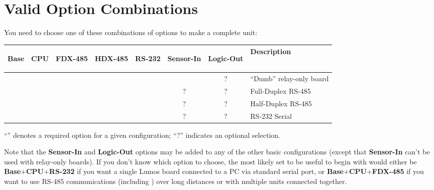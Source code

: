 \documentclass[letterpaper,twoside,onecolumn,openright,final]{memoir}
\begin{document}
\section{Valid Option Combinations}
You need to choose one of these combinations of options to make a complete unit:
\begin{center}
    \begin{tabular}{|c|c|c|c|c|c|c|l|}\hline
	
\begin{sideways}\bfseries Base \end{sideways}
& \begin{sideways}\bfseries CPU \end{sideways}
& \begin{sideways}\bfseries FDX-485\end{sideways}
& \begin{sideways}\bfseries HDX-485\end{sideways}
& \begin{sideways}\bfseries RS-232 \end{sideways}
& \begin{sideways}\bfseries Sensor-In \end{sideways}
& \begin{sideways}\bfseries Logic-Out\quad\strut \end{sideways}
& \bfseries Description
\\\hline\hline
	\Checkmark&          &          &          &          &          & ?        & ``Dumb'' relay-only board\\\hline
	\Checkmark&\Checkmark&\Checkmark&          &          & ?        & ?        & Full-Duplex RS-485\\\hline
	\Checkmark&\Checkmark&          &\Checkmark&          & ?        & ?        & Half-Duplex RS-485\\\hline
	\Checkmark&\Checkmark&          &          &\Checkmark& ?        & ?        & RS-232 Serial\\\hline
    \end{tabular}
\end{center}

``\Checkmark'' denotes a required option for a given configuration; ``?'' indicates an optional selection.

Note that the {\bfseries Sensor-In} and {\bfseries Logic-Out} options may be added to any of the other basic
configurations (except that {\bfseries Sensor-In} can't be used with relay-only boards).  If you don't know which option to choose, the most likely
set to be useful to begin with would either be {\bfseries Base}+{\bfseries CPU}+{\bfseries RS-232} if
you want a single Lumos board connected to a PC via standard serial port, or
{\bfseries Base}+{\bfseries CPU}+{\bfseries FDX-485} if you want to use RS-485 communications (including
) over long distances or with multiple units connected together.
\end{document}
